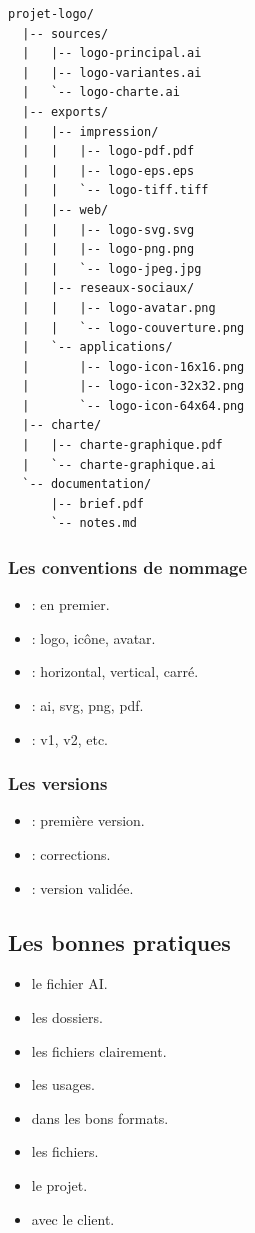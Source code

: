 \begin{verbatim}
projet-logo/
  |-- sources/
  |   |-- logo-principal.ai
  |   |-- logo-variantes.ai
  |   `-- logo-charte.ai
  |-- exports/
  |   |-- impression/
  |   |   |-- logo-pdf.pdf
  |   |   |-- logo-eps.eps
  |   |   `-- logo-tiff.tiff
  |   |-- web/
  |   |   |-- logo-svg.svg
  |   |   |-- logo-png.png
  |   |   `-- logo-jpeg.jpg
  |   |-- reseaux-sociaux/
  |   |   |-- logo-avatar.png
  |   |   `-- logo-couverture.png
  |   `-- applications/
  |       |-- logo-icon-16x16.png
  |       |-- logo-icon-32x32.png
  |       `-- logo-icon-64x64.png
  |-- charte/
  |   |-- charte-graphique.pdf
  |   `-- charte-graphique.ai
  `-- documentation/
      |-- brief.pdf
      `-- notes.md
\end{verbatim}

\subsubsection{Les conventions de nommage}

\begin{itemize}
    \item {} : en premier.
    \item {} : logo, icône, avatar.
    \item {} : horizontal, vertical, carré.
    \item {} : ai, svg, png, pdf.
    \item {} : v1, v2, etc.
\end{itemize}

\subsubsection{Les versions}

\begin{itemize}
    \item {} : première version.
    \item {} : corrections.
    \item {} : version validée.
\end{itemize}

\subsection{Les bonnes pratiques}

\begin{itemize}
    \item {} le fichier AI.
    \item {} les dossiers.
    \item {} les fichiers clairement.
    \item {} les usages.
    \item {} dans les bons formats.
    \item {} les fichiers.
    \item {} le projet.
    \item {} avec le client.
\end{itemize}

